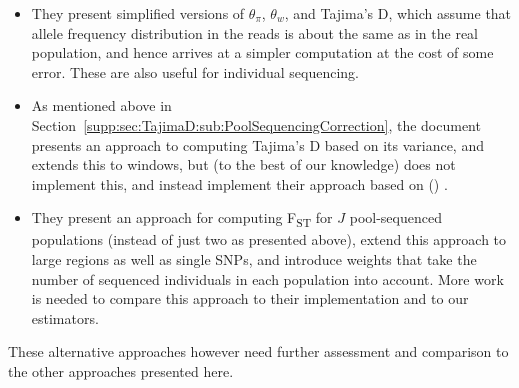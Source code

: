 \documentclass[a4paper,fontsize=9pt,DIV=14]{scrartcl}
\newcounter{popoolissue}
\newcommand\popoolissue[1]{}
\newcommand\citeay[1]{\citeauthor{#1} (\citeyear{#1}) \cite{#1}}
\newcommand\toolname{\textsc}
\newcommand\secref[1]{Section~\ref{#1}}
\newcommand{\fst}{F\textsubscript{ST}}
\begin{document}
\begin{itemize}
  \item They present simplified versions of $\theta_\pi$, $\theta_w$, and Tajima's D, which assume that allele frequency distribution in the reads is about the same as in the real population, and hence arrives at a simpler computation at the cost of some error. These are also useful for individual sequencing.
  \item As mentioned above in \secref{supp:sec:TajimaD:sub:PoolSequencingCorrection}, the document presents an approach to computing Tajima's D based on its variance, and extends this to windows, but (to the best of our knowledge) does not implement this, and instead implement their approach based on \citeay{Achaz2008}.
  \item They present an approach for computing \fst{} for $J$ pool-sequenced populations (instead of just two as presented above), extend this approach to large regions as well as single SNPs, and introduce weights that take the number of sequenced individuals in each population into account. More work is needed to compare this approach to their implementation and to our estimators.
\end{itemize}

These alternative approaches however need further assessment and comparison to the other approaches presented here.

\popoolissue{Lastly, we wanted to note that to us it seems that some equations in the PoPoolation equations document are not actually implemented in the code, and that the code contains compuations that are not in the document. We hence think that those were never intended to go hand in hand, and that hence the equations document is also not part of the official publication, but merely found in the code repository. Is that assessment correct, or are there other reasons for the divergence between the two?}


\end{document}
